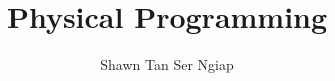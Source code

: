 \documentclass[a4paper,10pt]{book}
\begin{document}
\title{Physical Programming}
\author{Shawn Tan Ser Ngiap}

\maketitle

% 


% 
% 


\end{document}
